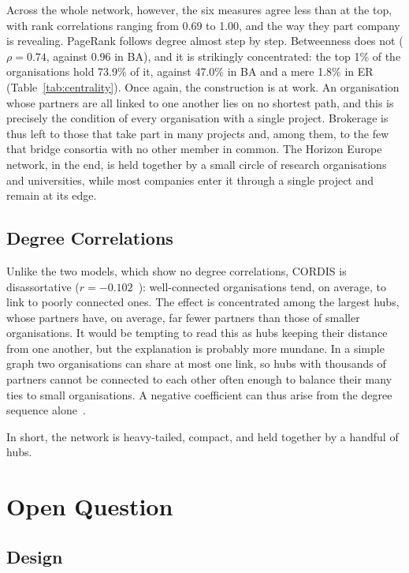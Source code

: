 \documentclass[sigchi]{acmart}
\begin{document}
Across the whole network, however, the six measures agree less than at the top, with rank correlations ranging from 0.69 to 1.00, and the way they part company is revealing. PageRank follows degree almost step by step. Betweenness does not ($\rho = 0.74$, against 0.96 in BA), and it is strikingly concentrated: the top 1\% of the organisations hold 73.9\% of it, against 47.0\% in BA and a mere 1.8\% in ER (Table~\ref{tab:centrality}). Once again, the construction is at work. An organisation whose partners are all linked to one another lies on no shortest path, and this is precisely the condition of every organisation with a single project. Brokerage is thus left to those that take part in many projects and, among them, to the few that bridge consortia with no other member in common. The Horizon Europe network, in the end, is held together by a small circle of research organisations and universities, while most companies enter it through a single project and remain at its edge.

\subsection{Degree Correlations}

Unlike the two models, which show no degree correlations, CORDIS is disassortative ($r = -0.102$~\cite{newman2002}): well-connected organisations tend, on average, to link to poorly connected ones. The effect is concentrated among the largest hubs, whose partners have, on average, far fewer partners than those of smaller organisations. It would be tempting to read this as hubs keeping their distance from one another, but the explanation is probably more mundane. In a simple graph two organisations can share at most one link, so hubs with thousands of partners cannot be connected to each other often enough to balance their many ties to small organisations. A negative coefficient can thus arise from the degree sequence alone~\cite{maslov2004,park2003}.

In short, the network is heavy-tailed, compact, and held together by a handful of hubs.

\section{Open Question}
\label{sec:open}

\subsection{Design}
\end{document}
